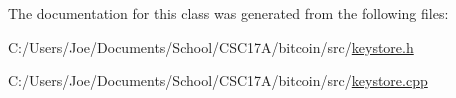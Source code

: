 The documentation for this class was generated from the following files\+:\begin{DoxyCompactItemize}
\item 
C\+:/\+Users/\+Joe/\+Documents/\+School/\+C\+S\+C17\+A/bitcoin/src/\hyperlink{keystore_8h}{keystore.\+h}\item 
C\+:/\+Users/\+Joe/\+Documents/\+School/\+C\+S\+C17\+A/bitcoin/src/\hyperlink{keystore_8cpp}{keystore.\+cpp}\end{DoxyCompactItemize}
